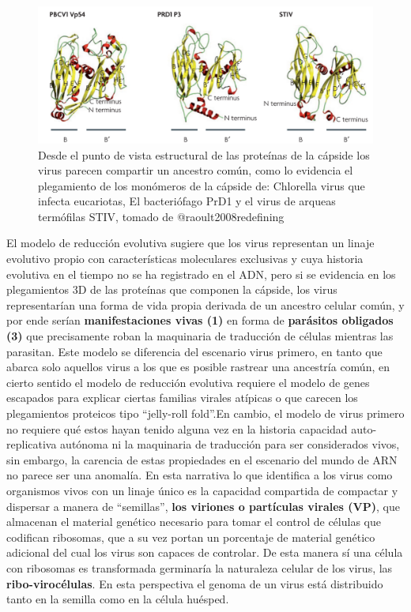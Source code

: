 \documentclass[
  12pt, krantz2,
  spanish,
]{krantz}
\begin{document}
\begin{figure}
\includegraphics[width=0.8\linewidth]{figures/jelly-roll} \caption{Desde el punto de vista estructural de las proteínas de la cápside los virus parecen compartir un ancestro común, como lo evidencia el plegamiento de los monómeros de la cápside de: Chlorella virus que infecta eucariotas, El bacteriófago PrD1 y el virus de arqueas termófilas STIV, tomado de @raoult2008redefining}\label{fig:jellyroll}
\end{figure}

El modelo de reducción evolutiva sugiere que los virus representan un linaje evolutivo propio con características moleculares exclusivas y cuya historia evolutiva en el tiempo no se ha registrado en el ADN, pero si se evidencia en los plegamientos 3D de las proteínas que componen la cápside, los virus representarían una forma de vida propia derivada de un ancestro celular común, y por ende serían \textbf{manifestaciones vivas (1)} en forma de \textbf{parásitos obligados (3)} que precisamente roban la maquinaria de traducción de células mientras las parasitan. Este modelo se diferencia del escenario virus primero, en tanto que abarca solo aquellos virus a los que es posible rastrear una ancestría común, en cierto sentido el modelo de reducción evolutiva requiere el modelo de genes escapados para explicar ciertas familias virales atípicas o que carecen los plegamientos proteicos tipo ``jelly-roll fold''.En cambio, el modelo de virus primero no requiere qué estos hayan tenido alguna vez en la historia capacidad auto-replicativa autónoma ni la maquinaria de traducción para ser considerados vivos, sin embargo, la carencia de estas propiedades en el escenario del mundo de ARN no parece ser una anomalía. En esta narrativa lo que identifica a los virus como organismos vivos con un linaje único es la capacidad compartida de compactar y dispersar a manera de ``semillas'', \textbf{los viriones o partículas virales (VP)}, que almacenan el material genético necesario para tomar el control de células que codifican ribosomas, que a su vez portan un porcentaje de material genético adicional del cual los virus son capaces de controlar. De esta manera sí una célula con ribosomas es transformada germinaría la naturaleza celular de los virus, las \textbf{ribo-virocélulas}. En esta perspectiva el genoma de un virus está distribuido tanto en la semilla como en la célula huésped.
\end{document}
